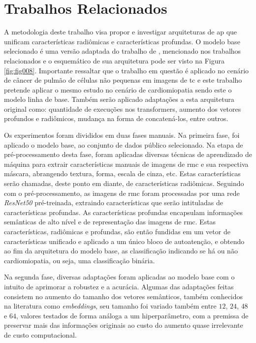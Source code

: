 \chapter{Trabalhos Relacionados}
\label{chap:metodologia}
\vspace{-\baselineskip} %


A metodologia deste trabalho visa propor e investigar arquiteturas de \gls{ap} que unificam características radiômicas e características profundas. O modelo base selecionado é uma versão adaptada do trabalho de , mencionado nos trabalhos relacionados e o esquemático de sua arquitetura pode ser visto na Figura \ref{fig:fig008}. Importante ressaltar que o trabalho em questão é aplicado no cenário de câncer de pulmão de células não pequenas em imagens de \gls{tc} e este trabalho pretende aplicar o mesmo estudo no cenário de cardiomiopatia sendo este o modelo linha de base. Também serão aplicado adaptações a esta arquitetura original como: quantidade de execuções nos transformers, aumento dos vetores profundos e radiômicos, mudança na forma de concatená-los, entre outros.

 Os experimentos foram divididos em duas fases manuais. Na primeira fase, foi aplicado o modelo base, ao conjunto de dados público selecionado. Na etapa de pré-processamento desta fase, foram aplicadas diversas técnicas de aprendizado de máquina para extrair características manuais de imagens de \gls{rmc} e sua respectiva máscara, abrangendo textura, forma, escala de cinza, etc. Estas características serão chamadas, deste ponto em diante, de características radiômicas. Seguindo com o pré-processamento, as imagens de \gls{rmc} foram processadas por uma rede \textit{ResNet50} pré-treinada, extraindo características que serão intituladas de características profundas. As características profundas encapsulam informações semânticas de alto nível e de representação das imagens de \gls{rmc}. Estas características, radiômicas e profundas, são então fundidas em um vetor de características unificado e aplicado a um único bloco de autoatenção, e obtendo ao fim da arquitetura do modelo base, as classificação indicando se há ou não cardiomiopatia, ou seja, uma classificação binária.

Na segunda fase, diversas adaptações foram aplicadas ao modelo base com o intuito de aprimorar a robustez e a acurácia. Algumas das adaptações feitas consistem no aumento do tamanho dos vetores semânticos, também conhecidos na literatura como \textit{embeddings}, seu tamanho foi variado também entre $12$, $24$, $48$ e $64$, valores testados de forma análoga a um hiperparâmetro, com a premissa de preservar mais das informações originais ao custo do aumento quase irrelevante de custo computacional.

